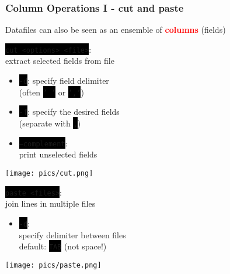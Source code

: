 \documentclass[unknownkeysallowed, 10pt, a4 paper, handout]{beamer}
\newcommand{\focus}[1]{\textbf{\textcolor{red}{#1}}}
\newcommand{\code}[1]{\colorbox{black}{\color{green}\texttt{#1}}}
\newcommand{\sidebyside}[5]{
  \begin{minipage}{#1\textwidth}
    #2
  \end{minipage} #3 \begin{minipage}{#4\textwidth}
    #5
  \end{minipage}
}
\begin{document}
\begin{frame}
  \begin{center}
    \frametitle{Column Operations I - cut and paste}

    Datafiles can also be seen as an ensemble of \focus{columns} (fields)

    \sidebyside{0.50}{
      \code{cut <options> <file>}:\\
      extract selected fields from file

      \vspace{3mm}

      \begin{itemize}
        \item \code{-d}: specify field delimiter\\
          (often \code{' '} or \code{','})
        \item \code{-f}: specify the desired fields\\
          (separate with \code{,})
        \item \code{--complement}:\\
          print unselected fields
      \end{itemize}
    }{\hfill}{0.46}{
      \begin{center}
        \texttt{[image: pics/cut.png]}
      \end{center}
    }

    \vspace{1mm}

    \sidebyside{0.49}{
      \code{paste <files>}:\\
      join lines in multiple files

      \begin{itemize}
        \item \code{-d}:\\
          specify delimiter between files\\
          default: \code{TAB} (not space!)
      \end{itemize}
    }{\hfill}{0.48}{
      \begin{center}
        \texttt{[image: pics/paste.png]}
      \end{center}
    }
  \end{center}
\end{frame}
\end{document}
